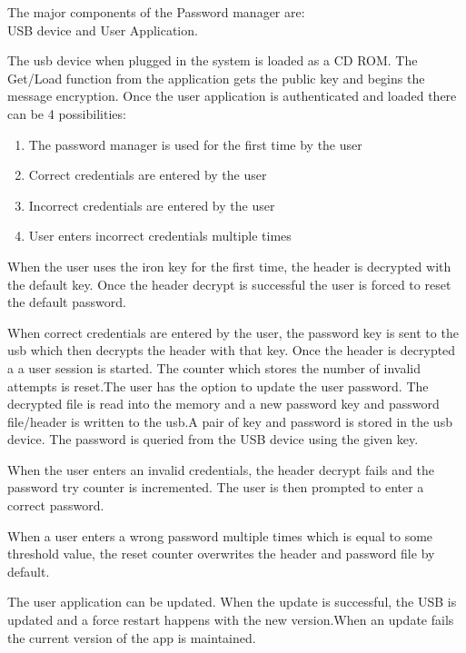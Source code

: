 The major components of the Password manager are:\\  USB device and User Application.

The usb device when plugged in the system is loaded as a CD ROM. The Get/Load
function from the application gets the public key and begins the message
encryption. Once the user application is authenticated and loaded there can be 4
possibilities:
\begin{enumerate}
\item The password manager is used for the first time by the user
\item Correct credentials are entered by the user
\item Incorrect credentials are entered by the user
\item User enters incorrect credentials multiple times
\end{enumerate}

When the user uses the iron key for the first time, the header is decrypted with
the default key. Once the header decrypt is successful the user is forced to
reset the default password.

When correct credentials are entered by the user, the password key is sent to
the usb which then decrypts the header with that key.  Once the header is
decrypted a a user session is started. The counter which stores the number of
invalid attempts is reset.The user has the option to update the user
password. The decrypted file is read into the memory and a new password key and
password file/header is written to the usb.A pair of key and password is stored
in the usb device. The password is queried from the USB device using the given
key.

When the user enters an invalid credentials, the header decrypt fails and the password
try counter is incremented. The user is then prompted to enter a correct password.

When a user enters a wrong password multiple times which is equal to some
threshold value, the reset counter overwrites the header and password file by
default.

The user application can be updated. When the update is successful, the USB is
updated and a force restart happens with the new version.When an update fails
the current version of the app is maintained.

